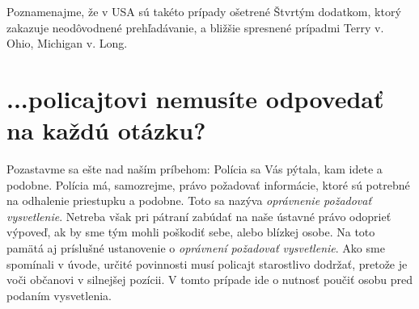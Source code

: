 \documentclass[openany]{book}
\begin{document}
Poznamenajme, že v USA sú takéto prípady ošetrené Štvrtým dodatkom, ktorý zakazuje neodôvodnené prehľadávanie, a bližšie spresnené prípadmi Terry v. Ohio, Michigan v. Long.


\section*{...policajtovi nemusíte odpovedať na každú otázku?}

Pozastavme sa ešte nad naším príbehom: Polícia sa Vás pýtala, kam idete a podobne. Polícia má, samozrejme, právo požadovať informácie, ktoré sú potrebné na odhalenie priestupku a podobne. Toto sa nazýva \emph{oprávnenie požadovať vysvetlenie}. Netreba však pri pátraní zabúdať na naše ústavné právo odoprieť výpoveď, ak by sme tým mohli poškodiť sebe, alebo blízkej osobe. Na toto pamätá aj príslušné ustanovenie o \emph{oprávnení požadovať vysvetlenie}. Ako sme spomínali v úvode, určité povinnosti musí policajt starostlivo dodržať, pretože je voči občanovi v silnejšej pozícii. V tomto prípade ide o nutnosť poučiť osobu pred podaním vysvetlenia.
\end{document}
